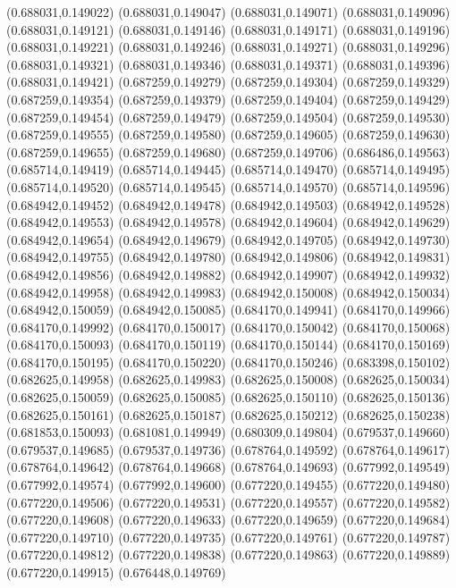 (0.688031,0.149022)
(0.688031,0.149047)
(0.688031,0.149071)
(0.688031,0.149096)
(0.688031,0.149121)
(0.688031,0.149146)
(0.688031,0.149171)
(0.688031,0.149196)
(0.688031,0.149221)
(0.688031,0.149246)
(0.688031,0.149271)
(0.688031,0.149296)
(0.688031,0.149321)
(0.688031,0.149346)
(0.688031,0.149371)
(0.688031,0.149396)
(0.688031,0.149421)
(0.687259,0.149279)
(0.687259,0.149304)
(0.687259,0.149329)
(0.687259,0.149354)
(0.687259,0.149379)
(0.687259,0.149404)
(0.687259,0.149429)
(0.687259,0.149454)
(0.687259,0.149479)
(0.687259,0.149504)
(0.687259,0.149530)
(0.687259,0.149555)
(0.687259,0.149580)
(0.687259,0.149605)
(0.687259,0.149630)
(0.687259,0.149655)
(0.687259,0.149680)
(0.687259,0.149706)
(0.686486,0.149563)
(0.685714,0.149419)
(0.685714,0.149445)
(0.685714,0.149470)
(0.685714,0.149495)
(0.685714,0.149520)
(0.685714,0.149545)
(0.685714,0.149570)
(0.685714,0.149596)
(0.684942,0.149452)
(0.684942,0.149478)
(0.684942,0.149503)
(0.684942,0.149528)
(0.684942,0.149553)
(0.684942,0.149578)
(0.684942,0.149604)
(0.684942,0.149629)
(0.684942,0.149654)
(0.684942,0.149679)
(0.684942,0.149705)
(0.684942,0.149730)
(0.684942,0.149755)
(0.684942,0.149780)
(0.684942,0.149806)
(0.684942,0.149831)
(0.684942,0.149856)
(0.684942,0.149882)
(0.684942,0.149907)
(0.684942,0.149932)
(0.684942,0.149958)
(0.684942,0.149983)
(0.684942,0.150008)
(0.684942,0.150034)
(0.684942,0.150059)
(0.684942,0.150085)
(0.684170,0.149941)
(0.684170,0.149966)
(0.684170,0.149992)
(0.684170,0.150017)
(0.684170,0.150042)
(0.684170,0.150068)
(0.684170,0.150093)
(0.684170,0.150119)
(0.684170,0.150144)
(0.684170,0.150169)
(0.684170,0.150195)
(0.684170,0.150220)
(0.684170,0.150246)
(0.683398,0.150102)
(0.682625,0.149958)
(0.682625,0.149983)
(0.682625,0.150008)
(0.682625,0.150034)
(0.682625,0.150059)
(0.682625,0.150085)
(0.682625,0.150110)
(0.682625,0.150136)
(0.682625,0.150161)
(0.682625,0.150187)
(0.682625,0.150212)
(0.682625,0.150238)
(0.681853,0.150093)
(0.681081,0.149949)
(0.680309,0.149804)
(0.679537,0.149660)
(0.679537,0.149685)
(0.679537,0.149736)
(0.678764,0.149592)
(0.678764,0.149617)
(0.678764,0.149642)
(0.678764,0.149668)
(0.678764,0.149693)
(0.677992,0.149549)
(0.677992,0.149574)
(0.677992,0.149600)
(0.677220,0.149455)
(0.677220,0.149480)
(0.677220,0.149506)
(0.677220,0.149531)
(0.677220,0.149557)
(0.677220,0.149582)
(0.677220,0.149608)
(0.677220,0.149633)
(0.677220,0.149659)
(0.677220,0.149684)
(0.677220,0.149710)
(0.677220,0.149735)
(0.677220,0.149761)
(0.677220,0.149787)
(0.677220,0.149812)
(0.677220,0.149838)
(0.677220,0.149863)
(0.677220,0.149889)
(0.677220,0.149915)
(0.676448,0.149769)
